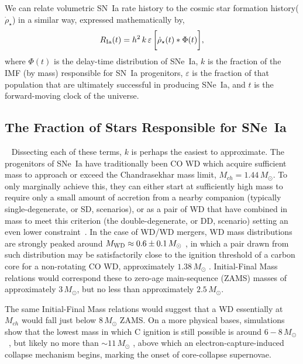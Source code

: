 \documentclass[apj]{aastex62}
\begin{document}
We can relate volumetric SN~Ia rate history to the cosmic star formation history($\dot{\rho}_{\star}$) in a similar way, expressed mathematically by, 
\begin{equation}
R_{\rm Ia}(t) =  h^2\,k\,\varepsilon\,\biggl[\dot{\rho}_{\star}(t) \ast \Phi(t)\biggr],
\label{eqn:std}
\end{equation}
\noindent where $\Phi(t)$ is the delay-time distribution of SNe~Ia, $k$ is the fraction of the IMF (by mass) responsible for SN~Ia progenitors, $\varepsilon$ is the fraction of that population that are ultimately successful in producing SNe~Ia, and $t$ is the forward-moving clock of the universe. 

\subsection{The Fraction of Stars Responsible for SNe~Ia}~\label{sec:wds}
Dissecting each of these terms, $k$ is perhaps the easiest to approximate. The progenitors of SNe~Ia have traditionally been CO WD which acquire sufficient mass to approach or exceed the Chandrasekhar mass limit, $M_{ch}=1.44\,M_{\odot}$. To only marginally achieve this, they can either start at sufficiently high mass to require only a small amount of accretion from a nearby companion (typically single-degenerate, or SD, scenarios), or as a pair of WD that have combined in mass to meet this criterion (the double-degenerate, or DD, scenario) setting an even lower constraint~\cite[see][ for a review]{Maoz:2013}. In the case of WD/WD mergers, WD mass distributions are strongly peaked around $M_{\rm WD}\approx0.6\pm0.1\,M_{\odot}$ \citep{Catalan:2008il}, in which a pair drawn from such distribution may be satisfactorily close to the ignition threshold of a carbon core for a non-rotating CO WD, approximately $1.38\, M_{\odot}$ \citep{Arnett:1969dw, Nomoto:1982vh}. Initial-Final Mass relations \cite[e.g.,][]{Catalan:2008il,Cummings:2018oe} would correspond these to zero-age main-sequence (ZAMS) masses of approximately $3\, M_{\odot}$, but no less than approximately $2.5\, M_{\odot}$. 

The same Initial-Final Mass relations would suggest that a WD essentially at $M_{ch}$ would fall just below $8\, M_{\odot}$ ZAMS. On a more physical bases, simulations show that the lowest mass in which C ignition is still possible is around $6-8 \,M_{\odot}$~\cite{Chen:2014rb,Denissenkov:2015rf}, but likely no more than $\sim11\, M_{\odot}$ \citep{Takahashi:2013jx}, above which an electron-capture-induced collapse mechanism begins, marking the onset of core-collapse supernovae.
\end{document}
